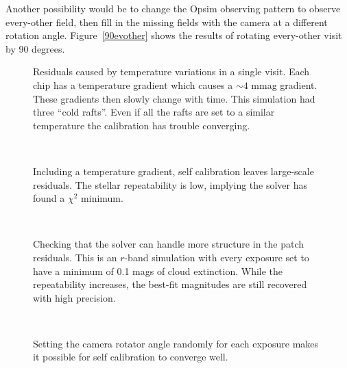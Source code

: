 Another possibility would be to change the Opsim observing pattern to observe every-other field, then fill in the missing fields with the camera at a different rotation angle.  Figure~\ref{90evother} shows the results of rotating every-other visit by 90 degrees.  

\begin{figure}
\caption{Residuals caused by temperature variations in a single visit.  Each chip has a temperature gradient which causes a $\sim 4$ mmag gradient.  These gradients then slowly change with time.  This simulation had three ``cold rafts''.  Even if all the rafts are set to a similar temperature the calibration has trouble converging.  \label{dmag_temperature}}
\end{figure}

\begin{figure}
\\
\caption{Including a temperature gradient, self calibration leaves large-scale residuals.  The stellar repeatability is low, implying the solver has found a $\chi^2$ minimum. \label{y_chip}}
\end{figure}

\begin{figure}
\\
\caption{Checking that the solver can handle more structure in the patch residuals.  This is an $r$-band simulation with every exposure set to have a minimum of 0.1 mags of cloud extinction.  While the repeatability increases, the best-fit magnitudes are still recovered with high precision. \label{min_clouds}}
\end{figure}

\begin{figure}
\\
\caption{Setting the camera rotator angle randomly for each exposure makes it possible for self calibration to converge well. \label{randrot}}
\end{figure}


